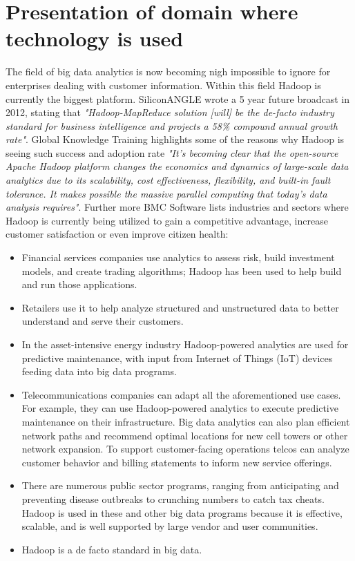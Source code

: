 \documentclass[a4paper,english]{report}
\begin{document}
	\section{Presentation of domain where technology is used}
		The field of big data analytics is now becoming nigh impossible to ignore for enterprises dealing with customer information. Within this field Hadoop is currently the biggest platform. SiliconANGLE wrote a 5 year future broadcast in 2012, stating that \textit{"Hadoop-MapReduce solution [will] be the de-facto industry standard for business intelligence and projects a 58\% compound annual growth rate"}\cite{siliconA}.
		Global Knowledge Training highlights some of the reasons why Hadoop is seeing such success and adoption rate
		\textit{"It's becoming clear that the open-source Apache Hadoop platform changes the economics and dynamics of large-scale data analytics due to its scalability, cost effectiveness, flexibility, and built-in fault tolerance. It makes possible the massive parallel computing that today's data analysis requires"}\cite{globalknowledge}.
		Further more BMC Software lists industries and sectors where Hadoop is currently being utilized to gain a competitive advantage, increase customer satisfaction or even improve citizen health:
		\begin{itemize}
			\item Financial services companies use analytics to assess risk, build investment models, and create trading algorithms; Hadoop has been used to help build and run those applications\cite{bmc}.
			\item Retailers use it to help analyze structured and unstructured data to better understand and serve their customers\cite{bmc}.
			\item In the asset-intensive energy industry Hadoop-powered analytics are used for predictive maintenance, with input from Internet of Things (IoT) devices feeding data into big data programs\cite{bmc}.
			\item Telecommunications companies can adapt all the aforementioned use cases. For example, they can use Hadoop-powered analytics to execute predictive maintenance on their infrastructure. Big data analytics can also plan efficient network paths and recommend optimal locations for new cell towers or other network expansion. To support customer-facing operations telcos can analyze customer behavior and billing statements to inform new service offerings\cite{bmc}.
			\item There are numerous public sector programs, ranging from anticipating and preventing disease outbreaks to crunching numbers to catch tax cheats\cite{bmc}.
			Hadoop is used in these and other big data programs because it is effective, scalable, and is well supported by large vendor and user communities\cite{bmc}.
			\item Hadoop is a de facto standard in big data\cite{bmc}.
		\end{itemize}
	
\end{document}
